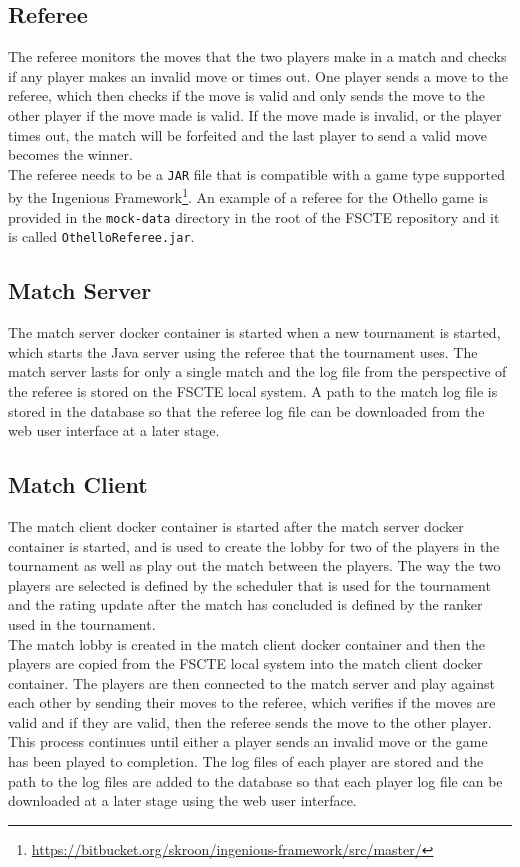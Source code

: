 \documentclass[a4paper, 11pt]{report}
\begin{document}
\subsection{Referee}
\label{sec:referee}

The referee monitors the moves that the two players make in a match and
checks if any player makes an invalid move or times out. One player sends a
move to the referee, which then checks if the move is valid and only sends
the move to the other player if the move made is valid. If the move made is
invalid, or the player times out, the match will be forfeited and the last player
to send a valid move becomes the winner. \\

The referee needs to be a \texttt{JAR} file that is compatible with a game type
supported by the Ingenious
Framework\footnote{\url{https://bitbucket.org/skroon/ingenious-framework/src/master/}}.
An example of a referee for the Othello game is provided in the \texttt{mock-data}
directory in the root of the FSCTE repository and it is called \texttt{OthelloReferee.jar}.

\subsection{Match Server}

The match server docker container is started when a new tournament is started,
which starts the Java server using the referee that the tournament uses. The match
server lasts for only a single match and the log file from the perspective of the
referee is stored on the FSCTE local system. A path to the match log file is stored
in the database so that the referee log file can be downloaded from the web user
interface at a later stage.

\subsection{Match Client}

The match client docker container is started after the match server docker container
is started, and is used to create the lobby for two of the players in the tournament
as well as play out the match between the players. The way the two players are
selected is defined by the scheduler that is used for the tournament and the
rating update after the match has concluded is defined by the ranker used in the
tournament. \\

The match lobby is created in the match client docker container and then the
players are copied from the FSCTE local system into the match client docker
container. The players are then connected to the match server and play against
each other by sending their moves to the referee, which verifies if the moves are
valid and if they are valid, then the referee sends the move to the other player.
This process continues until either a player sends an invalid move or the game
has been played to completion. The log files of each player are stored and the
path to the log files are added to the database so that each player log file can
be downloaded at a later stage using the web user interface.
\end{document}
